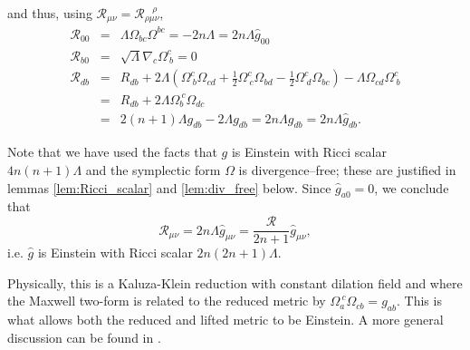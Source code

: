and thus, using $\mathcal{R}_{\mu\nu}=\mathcal{R}_{\rho\mu\nu}^{\ \ \ \ \rho}$,
\begin{eqnarray*}
\mathcal{R}_{00} & = & \Lambda\Omega_{bc}\Omega^{bc}=-2n\Lambda=2n\Lambda\hat{g}_{00}\\
\mathcal{R}_{b0} & = & \sqrt{\Lambda}\nabla_{c}\Omega_{\ b}^{c}=0\\
\mathcal{R}_{db} & = & R_{db}+2\Lambda(\Omega_{\ b}^{c}\Omega_{cd}+\frac{1}{2}\Omega_{\ c}^{c}\Omega_{bd}-\frac{1}{2}\Omega_{\ d}^{c}\Omega_{bc})-\Lambda\Omega_{cd}\Omega_{\ b}^{c}\\
 & = & R_{db}+2\Lambda\Omega_{b}^{\ c}\Omega_{dc}\\
 & = & 2(n+1)\Lambda g_{db}-2\Lambda g_{db}=2n\Lambda g_{db}=2n\Lambda\hat{g}_{db}.
\end{eqnarray*}


Note that we have used the facts that $g$ is Einstein with Ricci
scalar $4n(n+1)\Lambda$ and the symplectic form $\Omega$ is divergence--free;
these are justified in lemmas \ref{lem:Ricci_scalar} and \ref{lem:div_free} below. Since $\hat{g}_{a0}=0$,
we conclude that
\[
\mathcal{R}_{\mu\nu}=2n\Lambda\hat{g}_{\mu\nu}=\frac{\mathcal{R}}{2n+1}\hat{g}_{\mu\nu},
\]
i.e. $\hat{g}$ is Einstein with Ricci scalar $2n(2n+1)\Lambda$.
\koniec

Physically, this is a Kaluza-Klein reduction with constant dilation
field and where the Maxwell two-form is related to the reduced metric
by $\Omega_{a}^{\ c}\Omega_{cb}=g_{ab}$. This is what allows both
the reduced and lifted metric to be Einstein. A more general discussion
can be found in \cite{Pope}.

